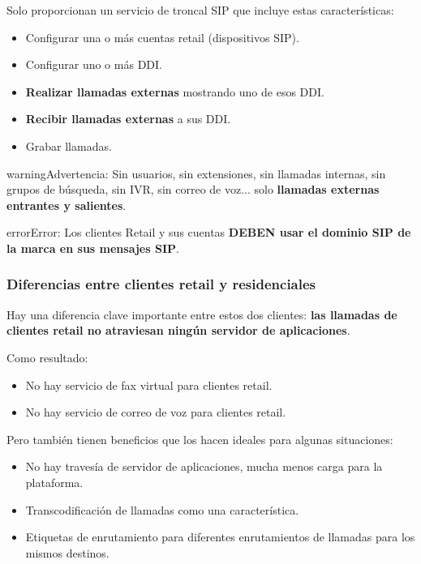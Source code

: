\documentclass[letterpaper,10pt,spanish]{sphinxmanual}
\begin{document}
Solo proporcionan un servicio de troncal SIP que incluye estas características:
\begin{itemize}
\item {} 
Configurar una o más cuentas retail (dispositivos SIP).

\item {} 
Configurar uno o más DDI.

\item {} 
\textbf{Realizar llamadas externas} mostrando uno de esos DDI.

\item {} 
\textbf{Recibir llamadas externas} a sus DDI.

\item {} 
Grabar llamadas.

\end{itemize}

\begin{notice}{warning}{Advertencia:}
Sin usuarios, sin extensiones, sin llamadas internas, sin grupos de búsqueda, sin IVR, sin correo de voz... solo \textbf{llamadas externas entrantes y salientes}.
\end{notice}

\begin{notice}{error}{Error:}
Los clientes Retail y sus cuentas \textbf{DEBEN usar el dominio SIP de la marca en sus mensajes SIP}.
\end{notice}


\subsubsection{Diferencias entre clientes retail y residenciales}
\label{administration_portal/brand/clients/retail:differences-between-retail-and-residential-clients}\label{administration_portal/brand/clients/retail:id1}
Hay una diferencia clave importante entre estos dos clientes: \textbf{las llamadas de clientes retail no atraviesan ningún servidor de aplicaciones}.

Como resultado:
\begin{itemize}
\item {} 
No hay servicio de fax virtual para clientes retail.

\item {} 
No hay servicio de correo de voz para clientes retail.

\end{itemize}

Pero también tienen beneficios que los hacen ideales para algunas situaciones:
\begin{itemize}
\item {} 
No hay travesía de servidor de aplicaciones, mucha menos carga para la plataforma.

\item {} 
Transcodificación de llamadas como una característica.

\item {} 
Etiquetas de enrutamiento para diferentes enrutamientos de llamadas para los mismos destinos.

\end{itemize}
\end{document}
